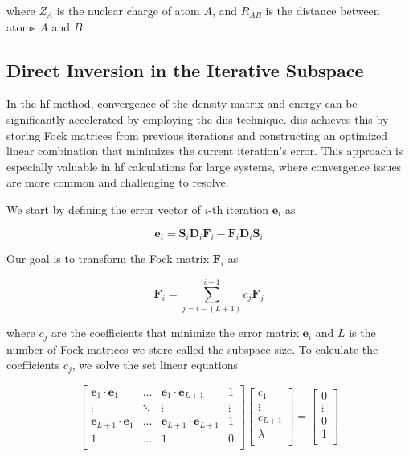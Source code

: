 where \(Z_A\) is the nuclear charge of atom \(A\), and \(R_{AB}\) is the distance between atoms \(A\) and \(B\).

\subsection{Direct Inversion in the Iterative Subspace}

In the \acrshort{hf} method, convergence of the density matrix and energy can be significantly accelerated by employing the \acrfull{diis} technique. \acrshort{diis} achieves this by storing Fock matrices from previous iterations and constructing an optimized linear combination that minimizes the current iteration's error. This approach is especially valuable in \acrshort{hf} calculations for large systems, where convergence issues are more common and challenging to resolve.

We start by defining the error vector of \(i\)-th iteration \(\mathbf{e}_i\) as

\begin{equation}
\mathbf{e}_i=\mathbf{S}_i\mathbf{D}_i\mathbf{F}_i-\mathbf{F}_i\mathbf{D}_i\mathbf{S}_i
\end{equation}

Our goal is to transform the Fock matrix \(\mathbf{F}_i\) as

\begin{equation}\label{eq:fock_extrapolate}
\mathbf{F}_i=\sum_{j=i-(L+1)}^{i-1}c_j\mathbf{F}_j
\end{equation}

where \(c_j\) are the coefficients that minimize the error matrix \(\mathbf{e}_i\) and \(L\) is the number of Fock matrices we store called the subspace size. To calculate the coefficients \(c_j\), we solve the set linear equations

\begin{equation}
\begin{bmatrix}
\mathbf{e}_1\cdot\mathbf{e}_1 & \dots & \mathbf{e}_1\cdot\mathbf{e}_{L+1} & 1 \\
\vdots & \ddots & \vdots & \vdots \\
\mathbf{e}_{L+1}\cdot\mathbf{e}_1 & \dots & \mathbf{e}_{L+1}\cdot\mathbf{e}_{L+1} & 1 \\
1 & \dots & 1 & 0 \\
\end{bmatrix}
\begin{bmatrix}
c_1 \\
\vdots \\
c_{L+1} \\
\lambda \\
\end{bmatrix}
=
\begin{bmatrix}
0 \\
\vdots \\
0 \\
1 \\
\end{bmatrix}
\end{equation}

